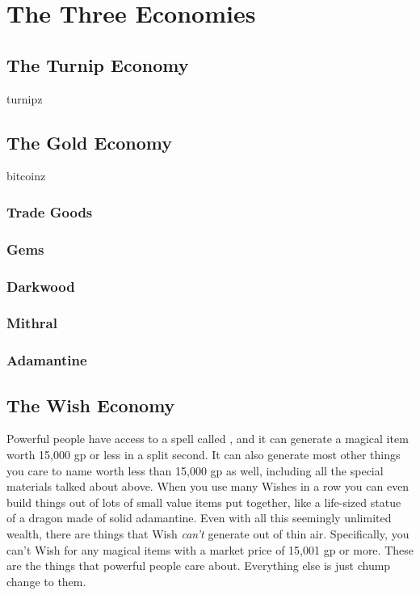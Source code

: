 \section{The Three Economies}

\subsection{The Turnip Economy}

turnipz

\subsection{The Gold Economy}

bitcoinz

\subsubsection{Trade Goods}

\subsubsection{Gems}

\subsubsection{Darkwood}

\subsubsection{Mithral}

\subsubsection{Adamantine}

\subsection{The Wish Economy}

Powerful people have access to a spell called , and it can generate a magical item worth 15,000 gp or less in a split second. It can also generate most other things you care to name worth less than 15,000 gp as well, including all the special materials talked about above. When you use many Wishes in a row you can even build things out of lots of small value items put together, like a life-sized statue of a dragon made of solid adamantine. Even with all this seemingly unlimited wealth, there are things that Wish \textit{can't} generate out of thin air. Specifically, you can't Wish for any magical items with a market price of 15,001 gp or more. These are the things that powerful people care about. Everything else is just chump change to them.

